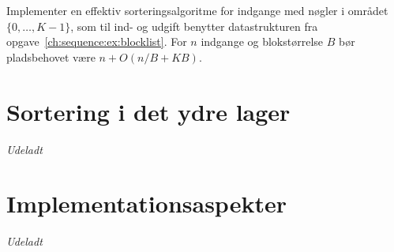 \begin{exerc}
  Implementer en effektiv sorteringsalgoritme for indgange med nøgler i området $\{0,\ldots,K-1\}$, som til ind- og udgift benytter datastrukturen fra opgave~\ref{ch:sequence:ex:blocklist}.
 For $n$ indgange og blokstørrelse $B$ bør pladsbehovet være $n+O(n/B+KB)$.
\end{exerc}

\section{Sortering i det ydre lager}

\emph{Udeladt}


\section{Implementationsaspekter}

\emph{Udeladt}

